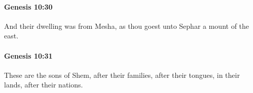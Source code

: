 		\paragraph{Genesis 10:30} %
			\label{GENESIS-10-30}

			And their dwelling was from Mesha, as thou goest unto Sephar a mount of the east.


		\paragraph{Genesis 10:31} %
			\label{GENESIS-10-31}

			These are the sons of Shem, after their families, after their tongues, in their lands, after their nations.


